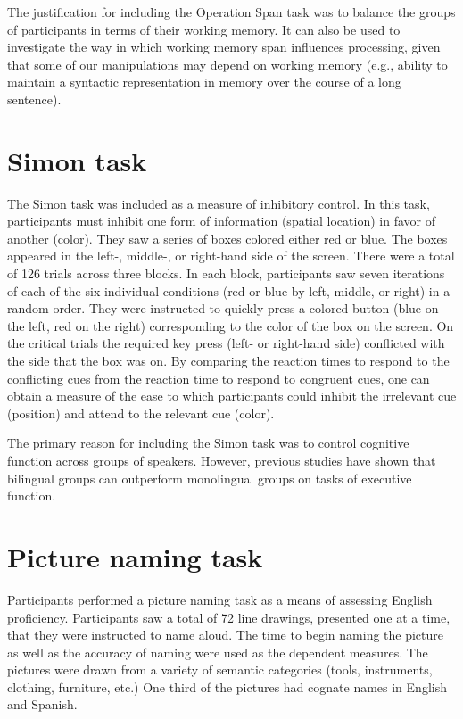 The justification for including the Operation Span task was to balance the groups of participants in terms of their working memory. It can also be used to investigate the way in which working memory span influences processing, given that some of our manipulations may depend on working memory (e.g., ability to maintain a syntactic representation in memory over the course of a long sentence).  

\section{Simon task}
The Simon task \parencite[][]{Simon1967} was included as a measure of inhibitory control. In this task,  participants must inhibit one form of information (spatial location) in favor of another (color). They saw a series of boxes colored either red or blue. The boxes appeared in the left-, middle-, or right-hand side of the screen. There were a total of 126 trials across three blocks. In each block, participants saw seven iterations of each of the six individual conditions (red or blue by left, middle, or right) in a random order. They were instructed  to quickly press a colored button (blue on the left, red on the right) corresponding to the color of the box on the screen. On the critical trials the required key press (left- or right-hand side) conflicted with the side that the box was on.  By comparing the reaction times to respond to the conflicting cues from the reaction time to respond to congruent cues, one can obtain a measure of the ease to which participants could inhibit the irrelevant cue (position) and attend to the relevant cue (color). 

The primary reason for including the Simon task was to control cognitive function across groups of speakers. However, previous studies have shown that bilingual groups can outperform monolingual groups on tasks of executive function.  

\section{Picture naming task}
Participants performed a picture naming task as a means of assessing English proficiency. Participants saw a total of 72 line drawings, presented one at a time, that they were instructed to name aloud. The time to begin naming the picture as well as the accuracy of naming were used as the dependent measures. The pictures were drawn from a variety of semantic categories (tools, instruments, clothing, furniture, etc.)  One third of the pictures had cognate names in English and Spanish. 

